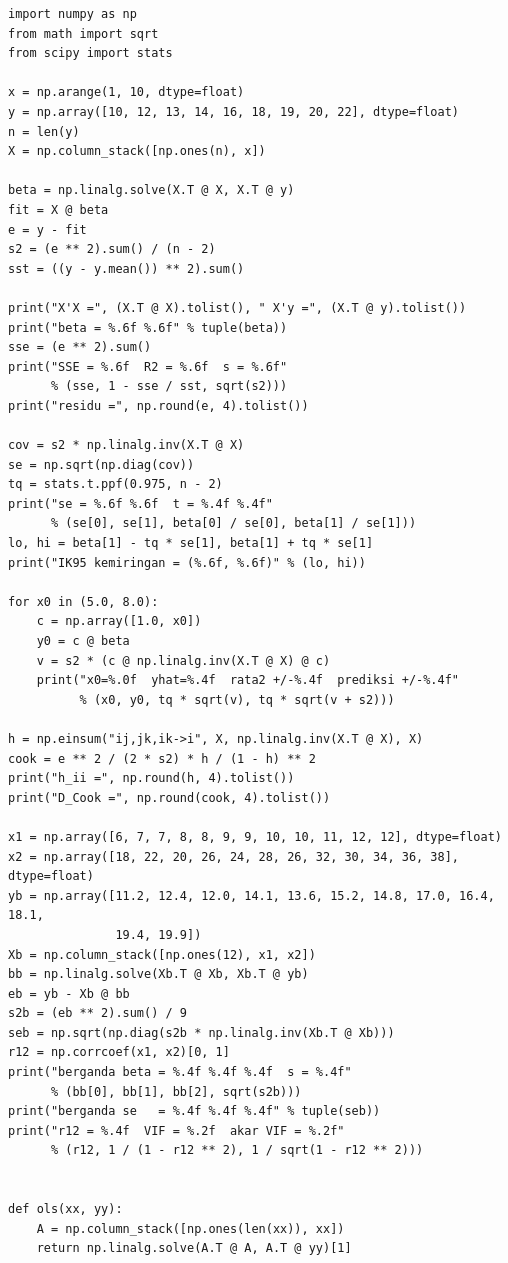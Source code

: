 \begin{lab}
\begin{verbatim}
import numpy as np
from math import sqrt
from scipy import stats

x = np.arange(1, 10, dtype=float)
y = np.array([10, 12, 13, 14, 16, 18, 19, 20, 22], dtype=float)
n = len(y)
X = np.column_stack([np.ones(n), x])

beta = np.linalg.solve(X.T @ X, X.T @ y)
fit = X @ beta
e = y - fit
s2 = (e ** 2).sum() / (n - 2)
sst = ((y - y.mean()) ** 2).sum()

print("X'X =", (X.T @ X).tolist(), " X'y =", (X.T @ y).tolist())
print("beta = %.6f %.6f" % tuple(beta))
sse = (e ** 2).sum()
print("SSE = %.6f  R2 = %.6f  s = %.6f"
      % (sse, 1 - sse / sst, sqrt(s2)))
print("residu =", np.round(e, 4).tolist())

cov = s2 * np.linalg.inv(X.T @ X)
se = np.sqrt(np.diag(cov))
tq = stats.t.ppf(0.975, n - 2)
print("se = %.6f %.6f  t = %.4f %.4f"
      % (se[0], se[1], beta[0] / se[0], beta[1] / se[1]))
lo, hi = beta[1] - tq * se[1], beta[1] + tq * se[1]
print("IK95 kemiringan = (%.6f, %.6f)" % (lo, hi))

for x0 in (5.0, 8.0):
    c = np.array([1.0, x0])
    y0 = c @ beta
    v = s2 * (c @ np.linalg.inv(X.T @ X) @ c)
    print("x0=%.0f  yhat=%.4f  rata2 +/-%.4f  prediksi +/-%.4f"
          % (x0, y0, tq * sqrt(v), tq * sqrt(v + s2)))

h = np.einsum("ij,jk,ik->i", X, np.linalg.inv(X.T @ X), X)
cook = e ** 2 / (2 * s2) * h / (1 - h) ** 2
print("h_ii =", np.round(h, 4).tolist())
print("D_Cook =", np.round(cook, 4).tolist())

x1 = np.array([6, 7, 7, 8, 8, 9, 9, 10, 10, 11, 12, 12], dtype=float)
x2 = np.array([18, 22, 20, 26, 24, 28, 26, 32, 30, 34, 36, 38], dtype=float)
yb = np.array([11.2, 12.4, 12.0, 14.1, 13.6, 15.2, 14.8, 17.0, 16.4, 18.1,
               19.4, 19.9])
Xb = np.column_stack([np.ones(12), x1, x2])
bb = np.linalg.solve(Xb.T @ Xb, Xb.T @ yb)
eb = yb - Xb @ bb
s2b = (eb ** 2).sum() / 9
seb = np.sqrt(np.diag(s2b * np.linalg.inv(Xb.T @ Xb)))
r12 = np.corrcoef(x1, x2)[0, 1]
print("berganda beta = %.4f %.4f %.4f  s = %.4f"
      % (bb[0], bb[1], bb[2], sqrt(s2b)))
print("berganda se   = %.4f %.4f %.4f" % tuple(seb))
print("r12 = %.4f  VIF = %.2f  akar VIF = %.2f"
      % (r12, 1 / (1 - r12 ** 2), 1 / sqrt(1 - r12 ** 2)))


def ols(xx, yy):
    A = np.column_stack([np.ones(len(xx)), xx])
    return np.linalg.solve(A.T @ A, A.T @ yy)[1]



\end{verbatim}
\end{lab}
